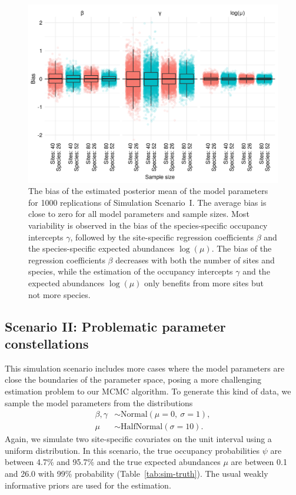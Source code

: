 \documentclass{article}
\begin{document}
\begin{figure}
\centering
\includegraphics[width=.7\linewidth]{figures/sim-1-bias}
\caption{The bias of the estimated posterior mean of the model parameters for 1000 replications of Simulation Scenario~I. The average bias is close to zero for all model parameters and sample sizes. Most variability is observed in the bias of the species-specific occupancy intercepts $\gamma$, followed by the site-specific regression coefficients $\beta$ and the species-specific expected abundances $\log(\mu)$. The bias of the regression coefficients $\beta$ decreases with both the number of sites and species, while the estimation of the occupancy intercepts $\gamma$ and the expected abundances $\log(\mu)$ only benefits from more sites but not more species.}
\label{fig:sim-1-bias}
\end{figure}

\subsection{Scenario II: Problematic parameter constellations}

This simulation scenario includes more cases where the model parameters are close the boundaries of the parameter space, posing a more challenging estimation problem to our MCMC algorithm. To generate this kind of data, we sample the model parameters from the distributions
\begin{align*}
\beta, \gamma &\sim \text{Normal}(\mu = 0,\ \sigma = 1), \\
          \mu &\sim \text{HalfNormal}(\sigma = 10).
\end{align*}
Again, we simulate two site-specific covariates on the unit interval using a uniform distribution. In this scenario, the true occupancy probabilities $\psi$ are between 4.7\% and 95.7\% and the true expected abundances $\mu$ are between 0.1 and 26.0 with 99\% probability (Table~\ref{tab:sim-truth}). The usual weakly informative priors are used for the estimation.
\end{document}
